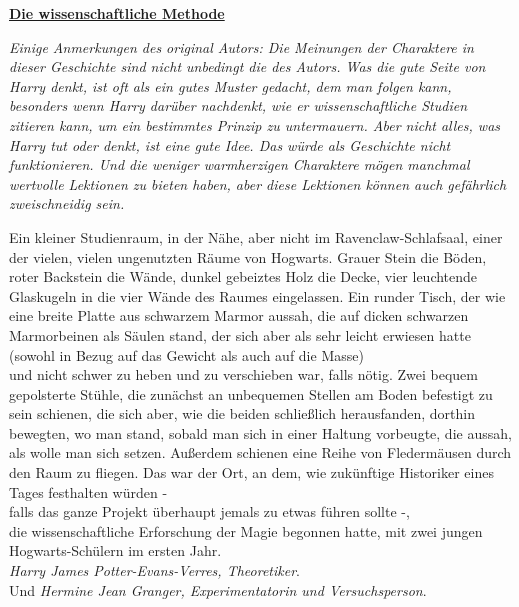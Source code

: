 

\hypertarget{die-wissenschaftliche-methode}{%

\textbf{\uline{Die wissenschaftliche Methode}}

\emph{Einige Anmerkungen des original Autors: Die Meinungen der Charaktere in dieser Geschichte sind nicht unbedingt die des Autors. Was die gute Seite von Harry denkt, ist oft als ein gutes Muster gedacht, dem man folgen kann, besonders wenn Harry darüber nachdenkt, wie er wissenschaftliche Studien zitieren kann, um ein bestimmtes Prinzip zu untermauern. Aber nicht alles, was Harry tut oder denkt, ist eine gute Idee. Das würde als Geschichte nicht funktionieren. Und die weniger warmherzigen Charaktere mögen manchmal wertvolle Lektionen zu bieten haben, aber diese Lektionen können auch gefährlich zweischneidig sein.}

Ein kleiner Studienraum, in der Nähe, aber nicht im Ravenclaw-Schlafsaal, einer der vielen, vielen ungenutzten Räume von Hogwarts. Grauer Stein die Böden, roter Backstein die Wände, dunkel gebeiztes Holz die Decke, vier leuchtende Glaskugeln in die vier Wände des Raumes eingelassen. Ein runder Tisch, der wie eine breite Platte aus schwarzem Marmor aussah, die auf dicken schwarzen Marmorbeinen als Säulen stand, der sich aber als sehr leicht erwiesen hatte\\ (sowohl in Bezug auf das Gewicht als auch auf die Masse)\\ und nicht schwer zu heben und zu verschieben war, falls nötig. Zwei bequem gepolsterte Stühle, die zunächst an unbequemen Stellen am Boden befestigt zu sein schienen, die sich aber, wie die beiden schließlich herausfanden, dorthin bewegten, wo man stand, sobald man sich in einer Haltung vorbeugte, die aussah, als wolle man sich setzen. Außerdem schienen eine Reihe von Fledermäusen durch den Raum zu fliegen. Das war der Ort, an dem, wie zukünftige Historiker eines Tages festhalten würden -\\ falls das ganze Projekt überhaupt jemals zu etwas führen sollte -,\\ die wissenschaftliche Erforschung der Magie begonnen hatte, mit zwei jungen Hogwarts-Schülern im ersten Jahr.\\ \emph{Harry James Potter-Evans-Verres, Theoretiker}.\\ Und \emph{Hermine Jean Granger, Experimentatorin und Versuchsperson}.

}
